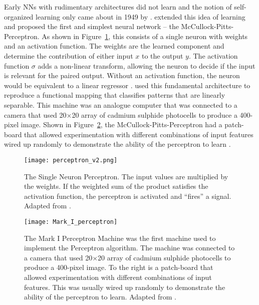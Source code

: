 Early \acp{NN} with rudimentary architectures did not learn \citep{McCulloch1943} and the notion of self-organized learning only came about in 1949 by \citet{Hebb1949}. \cite{Rosenblatt1958} extended this idea of learning and proposed the first and simplest neural network – the McCullock-Pitts-Perceptron. As shown in Figure~\ref{fig:perceptron}, this consists of a single neuron with weights and an activation function. The weights are the learned component and determine the contribution of either input $x$ to the output $y$. The activation function $\sigma$ adds a non-linear transform, allowing the neuron to decide if the input is relevant for the paired output. Without an activation function, the neuron would be equivalent to a linear regressor \citep{Minsky2017}. \cite{Rosenblatt1958} used this fundamental architecture to reproduce a functional mapping that classifies patterns that are linearly separable. This machine was an analogue computer that was connected to a camera that used 20×20 array of cadmium sulphide photocells to produce a 400-pixel image. Shown in Figure~\ref{fig:perceptron_mk1}, the McCullock-Pitts-Perceptron had a patch-board that allowed experimentation with different combinations of input features wired up randomly to demonstrate the ability of the perceptron to learn \citep{Hecht-Nielsen1990, Bishop2006}.

\begin{figure}[ht!]
	\centering
	\texttt{[image: perceptron\_v2.png]}
	\caption[The Single Neuron Perceptron]{The Single Neuron Perceptron. The input values are multiplied by the weights. If the weighted sum of the product satisfies the activation function, the perceptron is activated and ``fires'' a signal. Adapted from \cite{Rosenblatt1958}.}
	\label{fig:perceptron}
\end{figure}

\begin{figure}[ht!]
	\begin{minipage}[c]{0.4\textwidth}
		\centering
		\texttt{[image: Mark\_I\_perceptron]}
	\end{minipage}\hfill
	\begin{minipage}[c]{0.55\textwidth}
		\caption[Mark I Perceptron Machine]{The Mark I Perceptron Machine was the first machine used to implement the Perceptron algorithm. The machine was connected to a camera that used 20×20 array of cadmium sulphide photocells to produce a 400-pixel image. To the right is a patch-board that allowed experimentation with different combinations of input features. This was usually wired up randomly to demonstrate the ability of the perceptron to learn. Adapted from \cite{Hecht-Nielsen1990, Bishop2006}.}
		\label{fig:perceptron_mk1}
	\end{minipage}
\end{figure}

